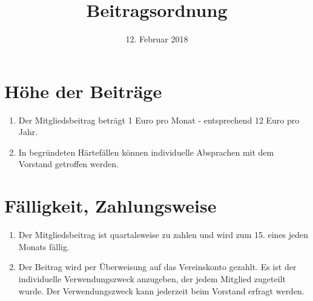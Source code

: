 \documentclass[a4paper, 12pt]{scrartcl}
\title{Beitragsordnung}
\author{}
\date{12. Februar 2018}
\begin{document}
\maketitle
\sffamily

\section{Höhe der Beiträge}
\begin{enumerate}
  \item Der Mitgliedsbeitrag beträgt 1 Euro pro Monat - entsprechend 12 Euro pro Jahr.
  \item In begründeten Härtefällen können individuelle Absprachen mit dem Vorstand getroffen werden.
\end{enumerate}

\section{Fälligkeit, Zahlungsweise}
\begin{enumerate}
	\item Der Mitgliedsbeitrag ist quartalsweise zu zahlen und wird zum 15. eines jeden Monats fällig.
	\item Der Beitrag wird per Überweisung auf das Vereinskonto gezahlt. Es ist der individuelle Verwendungszweck anzugeben, der jedem Mitglied zugeteilt wurde. Der Verwendungszweck kann jederzeit beim Vorstand erfragt werden.
\end{enumerate}
\end{document}
